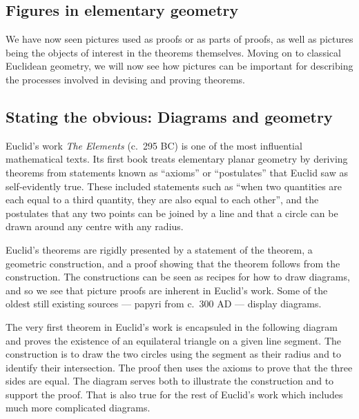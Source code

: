 \medskip

\subsection*{Figures in elementary geometry}
\noindent
We have now seen pictures used as proofs or as parts of proofs,
as well as pictures being the objects of interest in the theorems themselves.
Moving on to classical Euclidean geometry,
we will now see how pictures can be important for describing the
processes involved in devising and proving theorems.

\medskip

\subsection*{Stating the obvious: Diagrams and geometry}
\noindent
Euclid's work \textit{The Elements} (c.~295 BC)
is one of the most influential mathematical texts.
Its first book treats elementary planar geometry by deriving theorems from
statements known as ``axioms'' or ``postulates''
that Euclid saw as self-evidently true.
These included statements such as
``when two quantities are each equal to a third quantity,
they are also equal to each other'',
and the postulates that any two points can be joined by a line
and that a circle can be drawn around any centre with any radius.

Euclid's theorems are rigidly presented by a statement of the theorem,
a geometric construction,
and a proof showing that the theorem follows from the construction.
The constructions can be seen as recipes for how to draw diagrams,
and so we see that picture proofs are inherent in Euclid's work.
Some of the oldest still existing sources
--- papyri from c.~300 AD --- display diagrams.

The very first theorem in Euclid's work is encapsuled in the following
diagram and proves the existence of an equilateral triangle on a given line segment.
The construction is to draw the two circles using the segment as their radius and to identify their intersection.
The proof then uses the axioms to prove that the three sides are equal.
The diagram serves both to illustrate the construction and to support the proof.
That is also true for the rest of Euclid's work
which includes much more complicated diagrams.

\begin{center}
\end{center}

